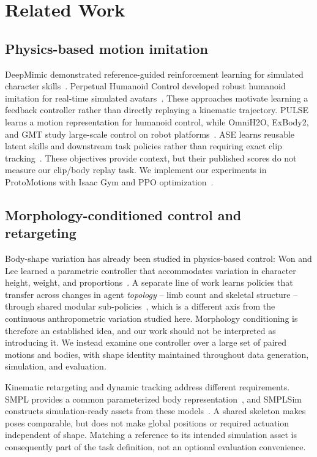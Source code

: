 \documentclass[11pt]{article}
\begin{document}
\section{Related Work}\label{sec:related_work}

\subsection{Physics-based motion imitation}

DeepMimic demonstrated reference-guided reinforcement learning for simulated
character skills~\cite{deepmimic}. Perpetual Humanoid Control developed robust
humanoid imitation for real-time simulated avatars~\cite{phc}. These approaches
motivate learning a feedback controller rather than directly replaying a
kinematic trajectory. PULSE learns a motion representation for humanoid control, while OmniH2O,
ExBody2, and GMT study large-scale control on robot platforms~\cite{pulse,omnih2o,exbody2,gmt}.
ASE learns reusable latent skills and downstream task policies rather than
requiring exact clip tracking~\cite{ase}. These objectives provide context,
but their published scores do not measure our clip/body replay task.
We implement our experiments in ProtoMotions with Isaac Gym and PPO
optimization~\cite{protomotions,isaacgym,ppo}.

\subsection{Morphology-conditioned control and retargeting}

Body-shape variation has already been studied in physics-based control:
Won and Lee learned a parametric controller that accommodates variation in
character height, weight, and proportions~\cite{won2019}. A separate line of
work learns policies that transfer across changes in agent \emph{topology} --
limb count and skeletal structure -- through shared modular
sub-policies~\cite{smp2020}, which is a different axis from the continuous
anthropometric variation studied here. Morphology conditioning is therefore
an established idea, and our work should not be interpreted as introducing it.
We instead examine one controller over a large set of paired motions and
bodies, with shape identity maintained throughout data generation,
simulation, and evaluation.

Kinematic retargeting and dynamic tracking address different requirements.
SMPL provides a common parameterized body representation~\cite{smpl}, and
SMPLSim constructs simulation-ready assets from these
models~\cite{smplsim}. A shared skeleton makes poses comparable, but does not
make global positions or required actuation independent of shape. Matching a
reference to its intended simulation asset is consequently part of the task
definition, not an optional evaluation convenience.
\end{document}
